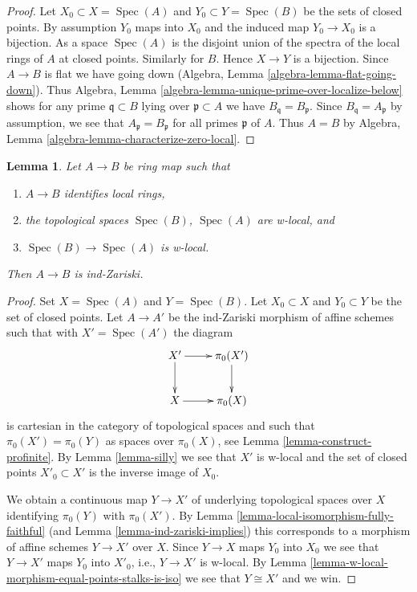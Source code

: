 \documentclass{stacks-project}
\theoremstyle{plain}
\newtheorem{lemma}[subsection]{Lemma}
\theoremstyle{definition}
\theoremstyle{remark}
\numberwithin{equation}{subsection}
\def\Spec{\mathop{\mathrm{Spec}}}
\begin{document}
\begin{proof}
Let $X_0 \subset X = \Spec(A)$ and $Y_0 \subset Y = \Spec(B)$ be the
sets of closed points. By assumption $Y_0$ maps into $X_0$ and
the induced map $Y_0 \to X_0$ is a bijection.
As a space $\Spec(A)$ is the disjoint union of the spectra
of the local rings of $A$ at closed points.
Similarly for $B$. Hence $X \to Y$ is a bijection.
Since $A \to B$ is flat we have going down
(Algebra, Lemma \ref{algebra-lemma-flat-going-down}).
Thus Algebra, Lemma \ref{algebra-lemma-unique-prime-over-localize-below}
shows for any prime $\mathfrak q \subset B$ lying over
$\mathfrak p \subset A$ we have $B_\mathfrak q = B_\mathfrak p$.
Since $B_\mathfrak q = A_\mathfrak p$ by assumption, we
see that $A_\mathfrak p = B_\mathfrak p$ for all primes $\mathfrak p$
of $A$. Thus $A = B$ by
Algebra, Lemma \ref{algebra-lemma-characterize-zero-local}.
\end{proof}

\begin{lemma}
\label{lemma-w-local-morphism-equal-stalks-is-ind-zariski}
Let $A \to B$ be ring map such that
\begin{enumerate}
\item $A \to B$ identifies local rings,
\item the topological spaces $\Spec(B)$, $\Spec(A)$ are w-local, and
\item $\Spec(B) \to \Spec(A)$ is w-local.
\end{enumerate}
Then $A \to B$ is ind-Zariski.
\end{lemma}

\begin{proof}
Set $X = \Spec(A)$ and $Y = \Spec(B)$. Let $X_0 \subset X$ and
$Y_0 \subset Y$ be the set of closed points. Let $A \to A'$ be the ind-Zariski
morphism of affine schemes such that with $X' = \Spec(A')$ the diagram
$$
\xymatrix{
X' \ar[r] \ar[d] & \pi_0(X') \ar[d] \\
X \ar[r] & \pi_0(X)
}
$$
is cartesian in the category of topological spaces and such that
$\pi_0(X') = \pi_0(Y)$ as spaces over $\pi_0(X)$, see
Lemma \ref{lemma-construct-profinite}. By
Lemma \ref{lemma-silly} we see that $X'$ is w-local and
the set of closed points $X'_0 \subset X'$ is the inverse image of $X_0$.

\medskip\noindent
We obtain a continuous map $Y \to X'$ of underlying topological spaces
over $X$ identifying $\pi_0(Y)$ with $\pi_0(X')$. By
Lemma \ref{lemma-local-isomorphism-fully-faithful}
(and Lemma \ref{lemma-ind-zariski-implies})
this corresponds to a morphism of affine schemes $Y \to X'$
over $X$. Since $Y \to X$ maps $Y_0$ into $X_0$ we see that
$Y \to X'$ maps $Y_0$ into $X'_0$, i.e., $Y \to X'$ is w-local.
By Lemma \ref{lemma-w-local-morphism-equal-points-stalks-is-iso}
we see that $Y \cong X'$ and we win.
\end{proof}
\end{document}
